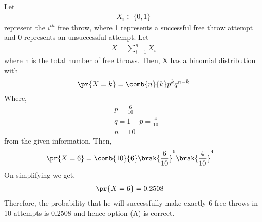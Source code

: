Let 
\begin{align}
X_{i}\in \{0,1\}
\end{align}
represent the $i^{th}$ free throw, where 1 represents a successful free throw attempt and 0 represents an unsuccessful attempt.
Let
\begin{align}
X=\sum_{i=1}^{n} X_{i}   
\end{align}
where n is the total number of free throws. Then, X has a binomial distribution with
\begin{align}
\pr {X=k}=\comb{n}{k} p^{k} q^{n-k}
\end{align}
Where,
\begin{align}
  &p=\frac{6}{10}\\
  &q=1-p=\frac{4}{10}\\
  &n=10
\end{align}
from the given information. Then,
\begin{align}
\pr{X=6}&=\comb{10}{6}\brak{\frac{6}{10}}^{6}\brak{\frac{4}{10}}^{4}
\end{align}
On simplifying we get,
\begin{align}
\pr{X=6}&=0.2508
\end{align}
Therefore, the probability that he will successfully make exactly 6 free throws in 10 attempts is 0.2508 and hence option (A) is correct.